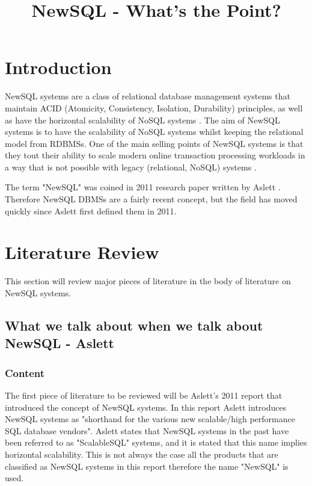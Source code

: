 \documentclass[10pt, conference]{IEEEtran}
\begin{document}
\title{NewSQL - What's the Point?}
\author{
}
\maketitle


\section{Introduction}

NewSQL systems are a class of relational database management systems that maintain ACID (Atomicity, Consistency, Isolation, Durability)  principles, as well as have the horizontal scalability of NoSQL systems \cite{pavlo}. The aim of NewSQL systems is to have the scalability of NoSQL systems whilst keeping the relational model from RDBMSs. One of the main selling points of NewSQL systems is that they tout their ability to scale modern online transaction processing workloads in a way that is not possible with legacy (relational, NoSQL) systems \cite{pavlo}.

The term "NewSQL" was coined in 2011 research paper written by Aslett \cite{aslett}. Therefore NewSQL DBMSs are a fairly recent concept, but the field has moved quickly since Aslett first defined them in 2011.


\section{Literature Review}

This section will review major pieces of literature in the body of literature on NewSQL systems.

\subsection{What we talk about when we talk about NewSQL - Aslett}

\subsubsection{Content}

The first piece of literature to be reviewed will be Aslett's 2011 report \cite{aslett} that introduced the concept of NewSQL systems. In this report Aslett introduces NewSQL systems as "shorthand for the various new scalable/high performance SQL database vendors". Aslett states that NewSQL systems in the past have been referred to as "ScalableSQL" systems, and it is stated that this name implies horizontal scalability. This is not always the case all the products that are classified as NewSQL systems in this report therefore the name "NewSQL" is used. 
\end{document}

